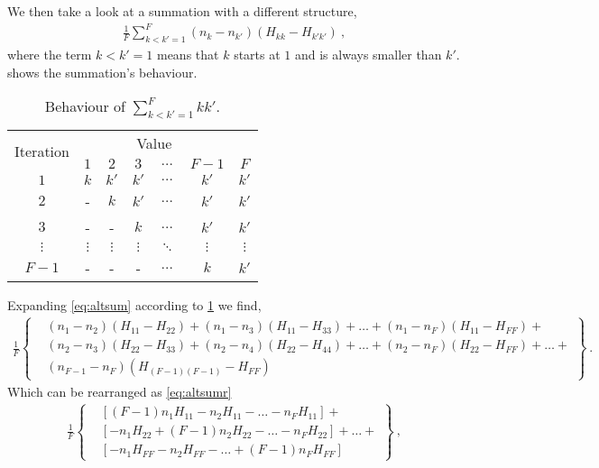 We then take a look at a summation with a different structure,
\begin{align}\label{eq:altsum}
\frac{1}{F} \sum\limits_{k<k'=1}^{F} (n_{k}-n_{k'})(H_{kk}-H_{k'k'})~,
\end{align}
where the term $ k<k'=1 $ means that $ k $ starts at $ 1 $ and is always smaller than $ k' $.  shows the summation's behaviour.
\begin{table}[H]
\centering
\caption[Behaviour of $ \sum\limits_{k<k'=1}^{F} kk'$.]{Behaviour of $ \sum\limits_{k<k'=1}^{F} kk'$.}
\label{t:iter}
\begin{tabular}{ccccccc}
\hline
\multirow{2}{*}{Iteration}&\multicolumn{5}{c}{Value}\\
\cline{2-7}
& $ 1 $ & $ 2 $ & $ 3 $ & $ \dots $ & $ F-1 $ & $ F $\\
\hline
$ 1 $ & $ k $ & $ k' $ & $ k' $ & $ \dots $ & $ k' $ & $ k' $ \\
$ 2 $ & - & $ k $ & $ k' $ & $ \dots $ & $ k' $ & $ k' $ \\
$ 3 $ & - & - & $ k $ & $ \dots $ & $ k' $ & $ k' $ \\
$ \vdots $ & $ \vdots $ & $ \vdots $ & $ \vdots $ & $ \ddots $ & $ \vdots $ & $ \vdots $ \\
$ F-1 $ & - & - & - & $ \dots $ & $ k $ & $ k' $ \\
\hline
\end{tabular}
\end{table}
Expanding \cref{eq:altsum} according to \cref{t:iter} we find,
\begin{align}
\frac{1}{F}\left\{\begin{aligned}
& (n_{1} - n_{2})(H_{11} - H_{22}) + (n_{1} - n_{3})(H_{11} - H_{33}) + \dots + (n_{1} - n_{F})(H_{11} - H_{FF}) + \\
& (n_{2} - n_{3})(H_{22} - H_{33}) + (n_{2} - n_{4})(H_{22} - H_{44}) + \dots + (n_{2} - n_{F})(H_{22} - H_{FF}) + \dots + \\
& (n_{F-1} - n_{F})(H_{(F-1)(F-1)} - H_{FF})
\end{aligned}\right\}~.
\end{align}
Which can be rearranged as \cref{eq:altsumr}
\begin{align}\label{eq:altsumr}
\frac{1}{F}\left\{\begin{aligned}
& \left[ (F-1)n_{1}H_{11} - n_{2}H_{11} - \dots - n_{F}H_{11} \right] + \\
& \left[ - n_{1}H_{22} + (F-1)n_{2}H_{22} - \dots - n_{F}H_{22} \right] + \dots + \\
& \left[ - n_{1}H_{FF} - n_{2}H_{FF} - \dots + (F-1)n_{F}H_{FF} \right]
\end{aligned}\right\}~,
\end{align}

